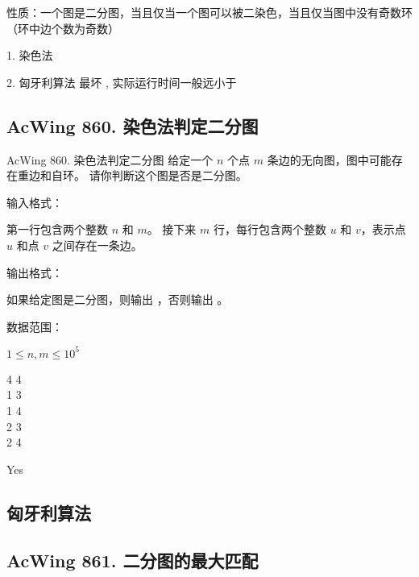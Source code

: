 性质：一个图是二分图，当且仅当一个图可以被二染色，当且仅当图中没有奇数环（环中边个数为奇数）

1. 染色法 

2. 匈牙利算法 最坏 , 实际运行时间一般远小于 

\subsection{AcWing 860. 染色法判定二分图}
\begin{titledbox}{AcWing 860. 染色法判定二分图}
    给定一个 $n$ 个点 $m$ 条边的无向图，图中可能存在重边和自环。 请你判断这个图是否是二分图。

    输入格式：

    第一行包含两个整数 $n$ 和 $m$。 接下来 $m$ 行，每行包含两个整数 $u$ 和 $v$，表示点 $u$ 和点 $v$ 之间存在一条边。

    输出格式：

    如果给定图是二分图，则输出 ，否则输出 。

    数据范围：

    $1 \le n,m \le 10^5$

    \begin{inputblock}
        4 4 \\
        1 3 \\
        1 4 \\
        2 3 \\
        2 4
    \end{inputblock}
    \begin{outputblock}
        Yes
    \end{outputblock}
\end{titledbox}

\subsection{匈牙利算法}

\subsection{AcWing 861. 二分图的最大匹配}

